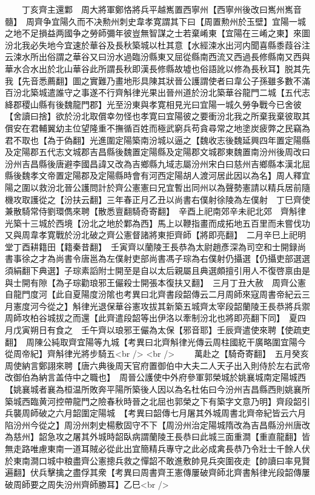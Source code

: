 　　丁亥齊主還鄴　周大將軍鄭恪將兵平越嶲置西寧州【西寧州後改曰嶲州嶲音髓】　周齊争宜陽久而不决勲州刺史韋孝寛謂其下曰【周置勲州於玉壁】宜陽一城之地不足損益两國争之勞師彌年彼豈無智謀之士若棄崤東【宜陽在三崤之東】來圖汾北我必失地今宜速於華谷及長秋築城以杜其意【水經涑水出河内聞喜縣黍葭谷注云涑水所出俗謂之華谷又曰汾水過臨汾縣東又屈從縣南西流又西過長修縣南又西與華水合水出於北山華谷此所謂長秋即漢長修縣故墟也俗語訛以修為長秋耳】脱其先我【先音悉薦翻】圖之實難乃畫地形具陳其狀晉公護謂使者曰韋公子孫雖多數不滿百汾北築城遣誰守之事遂不行齊斛律光果出晉州道於汾北築華谷龍門二城【五代志絳郡稷山縣有後魏龍門郡】光至汾東與孝寛相見光曰宜陽一城久勞争戰今已舍彼【舍讀曰捨】欲於汾北取償幸勿怪也孝寛曰宜陽彼之要衝汾北我之所棄我棄彼取其償安在君輔翼幼主位望隆重不撫循百姓而極武窮兵苟貪尋常之地塗炭疲弊之民竊為君不取也【為于偽翻】光進圍定陽築南汾城以逼之【魏收志後魏延興四年置定陽縣及定陽郡五代志文城郡吉昌縣後魏置定陽縣及定陽郡文城郡東魏置南汾州後周改曰汾州吉昌縣後唐避李國昌諱又改為吉鄉縣九域志屬汾州宋白曰慈州吉鄉縣本漢北屈縣後魏孝文帝置定陽郡及定陽縣時會有河西定陽胡人渡河居此因以為名】周人釋宜陽之圍以救汾北晉公護問計於齊公憲憲曰兄宜暫出同州以為聲勢憲請以精兵居前隨機攻取護從之【汾扶云翻】三年春正月乙丑以尚書右僕射徐陵為左僕射　丁巳齊使兼散騎常侍劉環儁來聘【散悉亶翻騎奇寄翻】　辛酉上祀南郊辛未祀北郊　齊斛律光築十三城於西境【汾北之地於鄴為西】馬上以鞭指畫而成拓地五百里而未嘗伐功又與周韋孝寛戰於汾北破之齊公憲督諸將東拒齊師【將即亮翻】　二月辛巳上祀明堂丁酉耕籍田【籍秦昔翻】　壬寅齊以蘭陵王長恭為太尉趙彥深為司空和士開録尚書事徐之才為尚書令唐邕為左僕射吏部尚書馮子琮為右僕射仍攝選【仍攝吏部選選須絹翻下典選】子琮素謟附士開至是自以太后親屬且典選頗擅引用人不復啓禀由是與士開有隙【為子琮勸琅邪王儼殺士開張本復扶又翻】　三月丁丑大赦　周齊公憲自龍門度河【此自夏陽度汾隂也考異曰北齊書段韶傳云二月周師來寇周書帝紀云三月憲度河今從之】斛律光退保華谷憲攻拔其新築五城齊太宰段韶蘭陵王長恭將兵禦周師攻柏谷城拔之而還【此齊遣段韶等出伊洛以牽制汾北也將即亮翻下同】　夏四月戊寅朔日有食之　壬午齊以琅邪王儼為太保【邪音耶】壬辰齊遣使來聘【使疏吏翻】　周陳公純取齊宜陽等九城【考異曰北齊斛律光傳云周柱國紇干廣略圍宜陽今從周帝紀】齊斛律光將步騎五<br />
<br />
　　萬赴之【騎奇寄翻】　五月癸亥周使納言鄭詡來聘【唐六典後周天官府置御伯中大夫二人天子出入則侍於左右武帝改御伯為納言盖侍中之職也】　周晉公護使中外府參軍郭榮城於姚襄城南定陽城西【姚襄城者襄為桓温所敗奔平陽所築後人因以為名杜佑曰今汾州吉昌縣西則姚襄所築城西臨黄河控帶龍門之險春秋時晉之北屈也郭榮之下有築字文意乃明】齊段韶引兵襲周師破之六月韶圍定陽城　【考異曰韶傳七月屠其外城周書北齊帝紀皆云六月陷汾州今從之】周汾州刺史楊敷固守不下【周汾州治定陽城隋改為吉昌縣汾州唐改為慈州】韶急攻之屠其外城時韶臥病謂蘭陵王長恭曰此城三面重澗【重直龍翻】皆無走路唯慮東南一道耳賊必從此出宜簡精兵專守之此必成禽長恭乃令壯士千餘人伏於東南澗口城中粮盡齊公憲摠兵救之憚韶不敢進敷帥見兵突圍夜走【帥讀曰率見賢遍翻】伏兵擊擒之盡俘其衆【考異曰周書齊王憲傳屢破齊師北齊書斛律光段韶傳屢破周師要之周失汾州齊師勝耳】乙巳<br />
